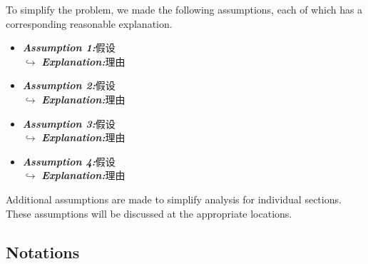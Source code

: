 \documentclass[12pt]{ctexart}
\begin{document}
To simplify the problem, we made the following assumptions, each of which has a corresponding reasonable explanation.
\begin{itemize}
  \item \textit{\textbf{Assumption 1:}}假设\\$\hookrightarrow$ \textit{\textbf{Explanation:}}理由

  \item \textit{\textbf{Assumption 2:}}假设\\$\hookrightarrow$ \textit{\textbf{Explanation:}}理由

  \item \textit{\textbf{Assumption 3:}}假设\\$\hookrightarrow$ \textit{\textbf{Explanation:}}理由

  \item \textit{\textbf{Assumption 4:}}假设\\$\hookrightarrow$ \textit{\textbf{Explanation:}}理由
\end{itemize}
Additional assumptions are made to simplify analysis for individual sections. These assumptions will be discussed at the appropriate locations.

\newpage
\subsection{Notations}%
\end{document}
